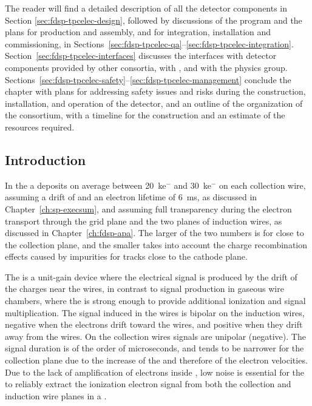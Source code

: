 The reader will find a detailed description of all the  detector 
components in Section \ref{sec:fdsp-tpcelec-design}, followed by discussions 
of the  program and the plans for production and assembly, 
and for integration, installation and commissioning, in 
Sections~\ref{sec:fdsp-tpcelec-qa}--\ref{sec:fdsp-tpcelec-integration}. 
Section~\ref{sec:fdsp-tpcelec-interfaces} discusses the interfaces with 
detector components provided by other consortia, with , and with the physics group. 
Sections~\ref{sec:fdsp-tpcelec-safety}--\ref{sec:fdsp-tpcelec-management} 
conclude the chapter with plans for addressing safety issues and risks during the
construction, installation, and operation of the detector, and 
an outline of the organization of the  consortium, 
with a timeline for the  construction and an estimate
of the resources required.

\subsection{Introduction}
\label{sec:fdsp-tpcelec-overview-intro}


In the   a  deposits on average between
\SI{20}{k}{e$^-$} and \SI{30}{k}{e$^-$} on each collection wire, assuming a drift \efield
of \spmaxfield and an electron lifetime of \SI{6}{ms}, as discussed in
Chapter~\ref{ch:sp-execsum}, and assuming full transparency during the 
electron transport through the grid plane and the two planes of induction
wires, as discussed in Chapter~\ref{ch:fdsp-apa}. The larger of the two numbers 
is for  close to the collection plane, and the smaller
takes into account the charge recombination effects caused by impurities for 
tracks close to the cathode plane. 

The    is a unit-gain device where the 
electrical signal is produced by the drift of the charges near the wires, 
in contrast to signal production in gaseous wire 
chambers, where the \efield is strong enough to provide additional
ionization and signal multiplication. The signal induced in the 
 wires is bipolar on the induction wires, negative when the
electrons drift toward the wires, and positive when they drift away from
the wires. On the collection wires signals are unipolar (negative).
The signal duration is of the order of microseconds, and tends to be narrower
for the collection plane due to the increase of the \efield and
therefore of the electron velocities. Due to the lack of amplification of 
electrons inside , low noise  is
essential for the  to reliably extract the ionization electron signal from both the 
collection and induction wire planes in a  . 

